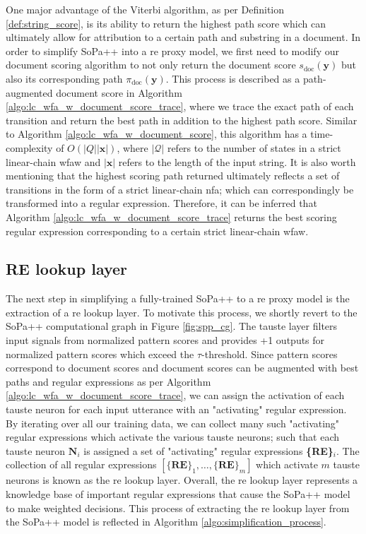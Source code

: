 One major advantage of the Viterbi algorithm, as per Definition
\ref{def:string_score}, is its ability to return the highest path score which
can ultimately allow for attribution to a certain path and substring in a
document. In order to simplify SoPa++ into a \ac{re} proxy model, we first need to
modify our document scoring algorithm to not only return the document score
$s_{\text{doc}}(\bm{y})$ but also its corresponding path
$\pi_{\text{doc}}(\bm{y})$. This process is described as a path-augmented
document score in Algorithm \ref{algo:lc_wfa_w_document_score_trace}, where we
trace the exact path of each transition and return the best path in addition to
the highest path score. Similar to Algorithm \ref{algo:lc_wfa_w_document_score},
this algorithm has a time-complexity of $O(|Q||\bm{x}|)$, where
$|\mathcal{Q}|$ refers to the number of states in a strict linear-chain
\ac{wfaw} and $|\bm{x}|$ refers to the length of the input string. It is also
worth mentioning that the highest scoring path returned ultimately reflects a set of
transitions in the form of a strict linear-chain \ac{nfa}; which can correspondingly
be transformed into a regular expression. Therefore, it can be inferred that
Algorithm \ref{algo:lc_wfa_w_document_score_trace} returns the best scoring
regular expression corresponding to a certain strict linear-chain \ac{wfaw}.

\subsection{RE lookup layer}

The next step in simplifying a fully-trained SoPa++ to a \ac{re} proxy model is the
extraction of a \ac{re} lookup layer. To motivate this process, we shortly revert to
the SoPa++ computational graph in Figure \ref{fig:spp_cg}. The \ac{tauste} layer
filters input signals from normalized pattern scores and provides +1 outputs for
normalized pattern scores which exceed the $\tau$-threshold. Since pattern
scores correspond to document scores and document scores can be augmented with
best paths and regular expressions as per Algorithm
\ref{algo:lc_wfa_w_document_score_trace}, we can assign the activation of each
\ac{tauste} neuron for each input utterance with an "activating" regular expression.
By iterating over all our training data, we can collect many such "activating"
regular expressions which activate the various \ac{tauste} neurons; such that each
\ac{tauste} neuron $\textbf{N}_i$ is assigned a set of "activating" regular expressions
\textbf{\{RE\}$_i$}. The collection of all regular expressions
$[\{\textbf{RE}\}_1, \ldots, \{\textbf{RE}\}_m]$ which activate $m$ \ac{tauste}
neurons is known as the \ac{re} lookup layer. Overall, the \ac{re} lookup layer represents
a knowledge base of important regular expressions that cause the SoPa++ model to
make weighted decisions. This process of extracting the \ac{re} lookup layer from
the SoPa++ model is reflected in Algorithm \ref{algo:simplification_process}.

